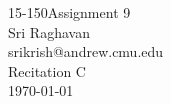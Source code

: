 \documentclass[11pt]{article}
\renewcommand{\maketitle}{
    \medskip
    \thispagestyle{plain}
    \begin{center}                  %
    {\Large \mycourse\;Assignment \myhwnum} \\
    \myname \\
    \myandrew \\
    Recitation \myrecitation\\
    \myduedate \\
    \end{center}
}
\begin{document}
\newcommand{\mycourse}{15-150}
\newcommand{\myname}{Sri Raghavan}
\newcommand{\myandrew}{srikrish@andrew.cmu.edu}
\newcommand{\myhwnum}{9}
\newcommand{\myrecitation}{C}
\newcommand{\myduedate}{\today}

\maketitle %

\newcommand{\code}[1]{\texttt{#1}}
\newcommand{\func}[2]{\textit{#1}(#2)}
\end{document}

